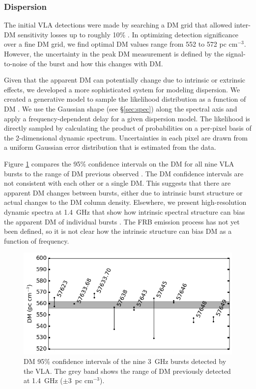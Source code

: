 \documentclass[twocolumn]{aastex61}
\begin{document}
\subsubsection{Dispersion}
The initial VLA detections were made by searching a DM grid that allowed inter-DM sensitivity losses up to roughly 10\% \citep[$\Delta DM=10\ \rm{pc}\ \rm{cm}^{-3}$][]{2003ApJ...596.1142C}. In optimizing detection significance over a fine DM grid, we find optimal DM values range from 552 to 572 pc cm$^{-3}$. However, the uncertainty in the peak DM measurement is defined by the signal-to-noise of the burst and how this changes with DM.

Given that the apparent DM can potentially change due to intrinsic or extrinsic effects, we developed a more sophisticated system for modeling dispersion. We created a generative model to sample the likelihood distribution as a function of DM \citep{2010arXiv1008.4686H}. We use the Gaussian shape (see \S \ref{sec:spec}) along the spectral axis and apply a frequency-dependent delay for a given dispersion model. The likelihood is directly sampled by calculating the product of probabilities on a per-pixel basis of the 2-dimensional dynamic spectrum. Uncertainties in each pixel are drawn from a uniform Gaussian error distribution that is estimated from the data.

Figure \ref{fig:dmmodel} compares the 95\% confidence intervals on the DM for all nine VLA bursts to the range of DM previous observed \citep{2014ApJ...790..101S,2016arXiv160308880S}. The DM confidence intervals are not consistent with each other or a single DM. This suggests that there are apparent DM changes between bursts, either due to intrinsic burst structure or actual changes to the DM column density. Elsewhere, we present high-resolution dynamic spectra at 1.4~GHz that show how intrinsic spectral structure can bias the apparent DM of individual bursts \citep{WEIRD}. The FRB emission process has not yet been defined, so it is not clear how the intrinsic structure can bias DM as a function of frequency.

\begin{figure}[htb]
\begin{center}
\includegraphics[width=0.9\columnwidth]{dmmodel}
\caption{DM 95\% confidence intervals of the nine 3~GHz bursts detected by the VLA. The grey band shows the range of DM previously detected at 1.4~GHz ($\pm3$\ pc cm$^{-3}$).
\label{fig:dmmodel}}
\end{center}
\end{figure}
\end{document}
